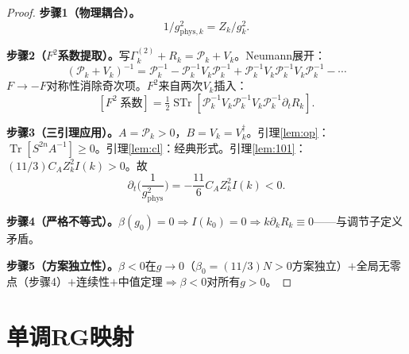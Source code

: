 \documentclass[12pt,a4paper]{article}
\theoremstyle{plain}
\theoremstyle{definition}\newtheorem{definition}[theorem]{定义}
\theoremstyle{remark}\newtheorem{remark}[theorem]{注记}
\begin{document}
\begin{proof}
\textbf{步骤1（物理耦合）。}
\begin{equation}\label{eq:gphys}
1/g_{\mathrm{phys},k}^2 = Z_k/g_k^2.
\end{equation}

\textbf{步骤2（$F^2$系数提取）。}写$\Gamma_k^{(2)}+R_k=\mathcal{P}_k+V_k$。Neumann展开：
\begin{equation}\label{eq:Neumann}
(\mathcal{P}_k+V_k)^{-1} = \mathcal{P}_k^{-1}-\mathcal{P}_k^{-1}V_k\mathcal{P}_k^{-1}+\mathcal{P}_k^{-1}V_k\mathcal{P}_k^{-1}V_k\mathcal{P}_k^{-1}-\cdots
\end{equation}
$F\to -F$对称性消除奇次项。$F^2$来自两次$V_k$插入：
\begin{equation}\label{eq:F2trace}
[F^2\;\text{系数}] = \tfrac{1}{2}\operatorname{STr}[\mathcal{P}_k^{-1}V_k\mathcal{P}_k^{-1}V_k\mathcal{P}_k^{-1}\partial_tR_k].
\end{equation}

\textbf{步骤3（三引理应用）。}$A=\mathcal{P}_k>0$，$B=V_k=V_k^\dagger$。引理\ref{lem:op}：$\operatorname{Tr}[S^{2n}A^{-1}]\geq 0$。引理\ref{lem:cl}：经典形式。引理\ref{lem:101}：$(11/3)C_AZ_k^2I(k)>0$。故
\begin{equation}\label{eq:betaflow}
\partial_t\!\Big(\frac{1}{g_{\mathrm{phys}}^2}\Big) = -\frac{11}{6}C_AZ_k^2I(k) < 0.
\end{equation}

\textbf{步骤4（严格不等式）。}$\beta(g_0)=0\Rightarrow I(k_0)=0\Rightarrow k\partial_kR_k\equiv 0$——与调节子定义矛盾。

\textbf{步骤5（方案独立性）。}$\beta<0$在$g\to 0$（$\beta_0=(11/3)N>0$方案独立）$+$全局无零点（步骤4）$+$连续性$+$中值定理$\Rightarrow\beta<0$对所有$g>0$。
\end{proof}


\section{单调RG映射}\label{sec:monotone}
\end{document}
